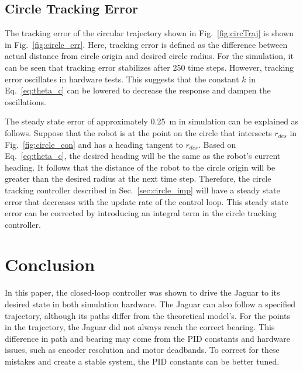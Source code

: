 \documentclass[conference]{../IEEEtran}
\begin{document}
\subsection{Circle Tracking Error}\label{sec:circT}

The tracking error of the circular trajectory shown in Fig.~\ref{fig:circTraj} is shown in
Fig.~\ref{fig:circle_err}. Here, tracking error is defined as the difference between
actual distance from circle origin and desired circle radius.  For the simulation, it can
be seen that tracking error stabilizes after 250 time steps.  However, tracking error
oscillates in hardware tests. This suggests that the constant $k$ in Eq.~\ref{eq:theta_c}
can be lowered to decrease the response and dampen the oscillations.

The steady state error of approximately \SI{0.25}{\meter} in simulation can be explained
as follows. Suppose that the robot is at the point on the circle that intersects $r_{des}$
in Fig.~\ref{fig:circle_con} and has a heading tangent to $r_{des}$.  Based on
Eq.~\ref{eq:theta_c}, the desired heading will be the same as the robot's current heading.
It follows that the distance of the robot to the circle origin will be greater than the
desired radius at the next time step. Therefore, the circle tracking controller described
in Sec.~\ref{sec:circle_imp} will have a steady state error that decreases with the update
rate of the control loop. This steady state error can be corrected by introducing an
integral term in the circle tracking controller.

\section{Conclusion}
In this paper, the closed-loop controller was shown to drive the Jaguar to its desired
state in both simulation hardware. The Jaguar can also follow a specified trajectory,
although its paths differ from the theoretical model's. For the points in the trajectory,
the Jaguar did not always reach the correct bearing. This difference in path and bearing
may come from the PID constants and hardware issues, such as encoder resolution and motor
deadbands. To correct for these mistakes and create a stable system, the PID constants can
be better tuned.

\nocite{*}


\end{document}
